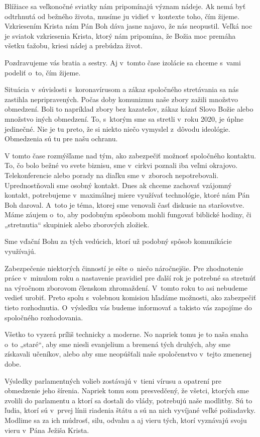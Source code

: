 Blížiace sa veľkonočné sviatky nám pripomínajú význam nádeje. Ak nemá byť odtrhnutá od bežného života, musíme ju vidieť v~kontexte toho, čím žijeme. Vzkriesením Krista nám Pán Boh dáva jasne najavo, že nás neopustil. Veľká noc je sviatok vzkriesenia Krista, ktorý nám pripomína, že Božia moc premáha všetku ťažobu, kriesi nádej a prebúdza život.



Pozdravujeme vás bratia a sestry. Aj v~tomto čase izolácie sa chceme s~vami podeliť o~to, čím žijeme.

Situácia v~súvislosti s~koronavírusom a zákaz spoločného stretávania sa nás zastihla nepripravených. Počas doby komunizmu naše zbory zažili množstvo obmedzení. Boli to napríklad zbory bez kazateľov, zákaz kázať Slovo Božie alebo množstvo iných obmedzení. To, s~ktorým sme sa stretli v~roku 2020, je úplne jedinečné. Nie je tu preto, že si niekto niečo vymyslel z~dôvodu ideológie.  Obmedzenia sú tu pre našu ochranu.

V tomto čase rozmýšľame nad tým, ako zabezpečiť možnosť spoločného kontaktu. To, čo bolo bežné vo svete biznisu, sme v~cirkvi poznali iba veľmi okrajovo. Telekonferencie alebo porady na diaľku sme v~zboroch nepotrebovali. Uprednostňovali sme osobný kontakt. Dnes ak chceme zachovať vzájomný kontakt, potrebujeme v~maximálnej miere využívať technológie, ktoré nám Pán Boh daroval. A~toto je téma, ktorej sme venovali časť diskusie na staršovstve. Máme záujem o~to, aby podobným spôsobom mohli fungovať biblické hodiny, či „stretnutia“ skupiniek alebo zborových zložiek.

Sme vďační Bohu za tých vedúcich, ktorí už podobný spôsob komunikácie využívajú.

Zabezpečenie niektorých činností je ešte o~niečo náročnejšie. Pre zhodnotenie práce v~minulom roku a nastavenie pravidiel pre ďalší rok je potrebné sa stretnúť na výročnom zborovom členskom zhromaždení. V~tomto roku to asi nebudeme vedieť urobiť. Preto spolu s~volebnou komisiou hľadáme možnosti, ako zabezpečiť tieto rozhodnutia. O~výsledku vás budeme informovať a takisto vás zapojíme do spoločného rozhodovania.

Všetko to vyzerá príliš technicky a moderne. No napriek tomu je to naša snaha o~to „staré“, aby sme niesli evanjelium a bremená tých druhých, aby sme získavali učeníkov, alebo aby sme neopúšťali naše spoločenstvo v~tejto zmenenej dobe.

Výsledky parlamentných volieb zostávajú v~tieni vírusu a opatrení pre obmedzenie jeho šírenia. Napriek tomu som presvedčený, že všetci, ktorých sme zvolili do parlamentu a ktorí sa dostali do vlády, potrebujú naše modlitby. Sú to ľudia, ktorí sú v~prvej línii riadenia štátu a sú na nich vyvíjané veľké požiadavky. Modlime sa za ich múdrosť, silu, odvahu a aj vieru tých, ktorí vyznávajú svoju vieru v~Pána Ježiša Krista.


